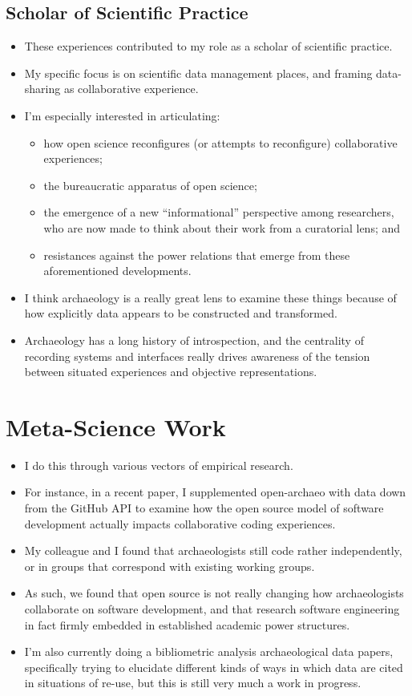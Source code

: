 \documentclass{article}
\begin{document}
\subsection{Scholar of Scientific Practice}
\begin{itemize}
  \item These experiences contributed to my role as a scholar of scientific practice.
  \item My specific focus is on scientific data management places, and framing data-sharing as collaborative experience.
  \item I’m especially interested in articulating:
  \begin{itemize}
    \item how open science reconfigures (or attempts to reconfigure) collaborative experiences;
    \item the bureaucratic apparatus of open science;
    \item the emergence of a new ``informational'' perspective among researchers, who are now made to think about their work from a curatorial lens; and
    \item resistances against the power relations that emerge from these aforementioned developments.
  \end{itemize}
  \item I think archaeology is a really great lens to examine these things because of how explicitly data appears to be constructed and transformed.
  \item Archaeology has a long history of introspection, and the centrality of recording systems and interfaces really drives awareness of the tension between situated experiences and objective representations.
\end{itemize}

\section{Meta-Science Work}
\begin{itemize}
  \item I do this through various vectors of empirical research.
  \item For instance, in a recent paper, I supplemented open-archaeo with data down from the GitHub API to examine how the open source model of software development actually impacts collaborative coding experiences.
  \item My colleague and I found that archaeologists still code rather independently, or in groups that correspond with existing working groups.
  \item As such, we found that open source is not really changing how archaeologists collaborate on software development, and that research software engineering in fact firmly embedded in established academic power structures.
  \item I’m also currently doing a bibliometric analysis archaeological data papers, specifically trying to elucidate different kinds of ways in which data are cited in situations of re-use, but this is still very much a work in progress.
\end{itemize}
\end{document}
